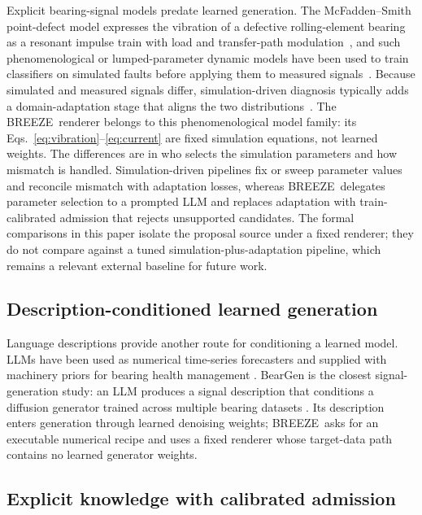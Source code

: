 \documentclass[a4paper,fleqn]{cas-sc}
\newcommand{\breeze}{BREEZE}
\begin{document}
Explicit bearing-signal models predate learned generation. The
McFadden--Smith point-defect model expresses the vibration of a defective
rolling-element bearing as a resonant impulse train with load and transfer-path
modulation~\citep{mcfadden1984model}, and such phenomenological or
lumped-parameter dynamic models have been used to train classifiers on
simulated faults before applying them to measured
signals~\citep{sobie2018simulation}. Because simulated and measured signals
differ, simulation-driven diagnosis typically adds a domain-adaptation stage
that aligns the two distributions~\citep{liu2022simulationdriven}. The \breeze\
renderer belongs to this phenomenological model family: its
Eqs.~\eqref{eq:vibration}--\eqref{eq:current} are fixed simulation equations,
not learned weights. The differences are in who selects the simulation
parameters and how mismatch is handled. Simulation-driven pipelines fix or
sweep parameter values and reconcile mismatch with adaptation losses, whereas
\breeze\ delegates parameter selection to a prompted LLM and replaces
adaptation with train-calibrated admission that rejects unsupported
candidates. The formal comparisons in this paper isolate the proposal source
under a fixed renderer; they do not compare against a tuned
simulation-plus-adaptation pipeline, which remains a relevant external
baseline for future work.

\subsection{Description-conditioned learned generation}

Language descriptions provide another route for conditioning a learned model.
LLMs have been used as numerical time-series forecasters and supplied with
machinery priors for bearing health management
\citep{gruver2023llmtime,peng2025bearllm}. BearGen is the closest
signal-generation study: an LLM produces a signal description that conditions
a diffusion generator trained across multiple bearing datasets
\citep{lee2026beargen}. Its description enters generation through learned
denoising weights; \breeze\ asks for an executable numerical recipe and uses a
fixed renderer whose target-data path contains no learned generator weights.

\subsection{Explicit knowledge with calibrated admission}
\end{document}
